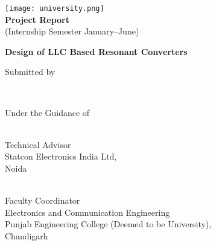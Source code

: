 \begin{titlepage}
    \begin{center}

        
        \texttt{[image: university.png]}\\
        {\textbf{Project Report}}\\
        \vspace*{0.2cm}
        (Internship Semester January--June)

        \vspace*{3cm}
        {\Large\textbf {Design of LLC Based Resonant Converters}}

        \vfill
        Submitted by

        \vfill
        \textbf{
        \name \\
        \sid
        }

        \vfill
        Under the Guidance of
    \end{center}
    \vfill

    \noindent
    
    \begin{minipage}[t]{0.4\textwidth}
        \raggedright
        \industry \\
        Technical Advisor\\
        Statcon Electronics India Ltd,\\
        Noida
    \end{minipage}
    \hfill
    \begin{minipage}[t]{0.55\textwidth}
        \raggedleft
        \faculty \\
        Faculty Coordinator\\
        Electronics and Communication Engineering\\
        Punjab Engineering College (Deemed to be University),\\
        Chandigarh
    \end{minipage}
\end{titlepage}